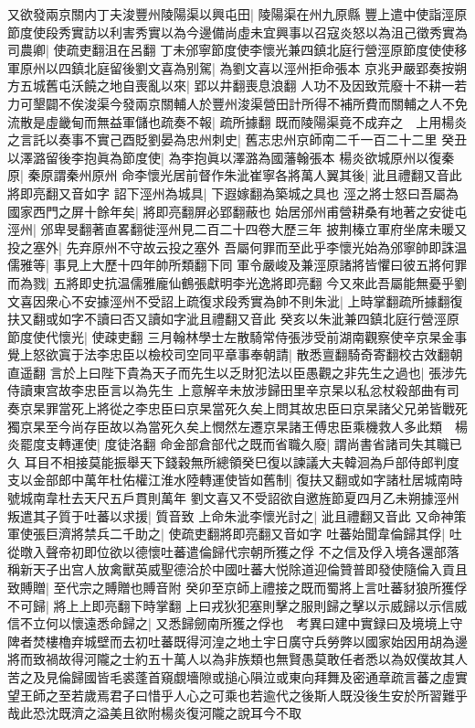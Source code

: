 又欲發兩京關内丁夫浚豐州陵陽渠以興屯田|{
	陵陽渠在州九原縣}
豐上遣中使詣涇原節度使段秀實訪以利害秀實以為今邊備尚虛未宜興事以召寇炎怒以為沮己徵秀實為司農卿|{
	使疏吏翻沮在呂翻}
丁未邠寧節度使李懷光兼四鎮北庭行營涇原節度使使移軍原州以四鎮北庭留後劉文喜為别駕|{
	為劉文喜以涇州拒命張本}
京兆尹嚴郢奏按朔方五城舊屯沃饒之地自喪亂以來|{
	郢以井翻喪息浪翻}
人功不及因致荒廢十不耕一若力可墾闢不俟浚渠今發兩京關輔人於豐州浚渠營田計所得不補所費而關輔之人不免流散是虛畿甸而無益軍儲也疏奏不報|{
	疏所據翻}
既而陵陽渠竟不成弃之　上用楊炎之言託以奏事不實己酉貶劉晏為忠州刺史|{
	舊志忠州京師南二千一百二十二里}
癸丑以澤潞留後李抱眞為節度使|{
	為李抱眞以澤潞為國藩翰張本}
楊炎欲城原州以復秦原|{
	秦原謂秦州原州}
命李懷光居前督作朱泚崔寧各將萬人翼其後|{
	泚且禮翻又音此將即亮翻又音如字}
詔下涇州為城具|{
	下遐嫁翻為築城之具也}
涇之將士怒曰吾屬為國家西門之屏十餘年矣|{
	將即亮翻屏必郢翻蔽也}
始居邠州甫營耕桑有地著之安徙屯涇州|{
	邠卑旻翻著直畧翻徙涇州見二百二十四卷大歷三年}
披荆榛立軍府坐席未暖又投之塞外|{
	先弃原州不守故云投之塞外}
吾屬何罪而至此乎李懷光始為邠寧帥即誅温儒雅等|{
	事見上大歷十四年帥所類翻下同}
軍令嚴峻及兼涇原諸將皆懼曰彼五將何罪而為戮|{
	五將即史抗温儒雅龐仙鶴張獻明李光逸將即亮翻}
今又來此吾屬能無憂乎劉文喜因衆心不安據涇州不受詔上疏復求段秀實為帥不則朱泚|{
	上時掌翻疏所據翻復扶又翻或如字不讀曰否又讀如字泚且禮翻又音此}
癸亥以朱泚兼四鎮北庭行營涇原節度使代懷光|{
	使疎吏翻}
三月翰林學士左散騎常侍張涉受前湖南觀察使辛京杲金事覺上怒欲寘于法李忠臣以檢校司空同平章事奉朝請|{
	散悉亶翻騎奇寄翻校古效翻朝直遥翻}
言於上曰陛下貴為天子而先生以乏財犯法以臣愚觀之非先生之過也|{
	張涉先侍讀東宫故李忠臣言以為先生}
上意解辛未放涉歸田里辛京杲以私忿杖殺部曲有司奏京杲罪當死上將從之李忠臣曰京杲當死久矣上問其故忠臣曰京杲諸父兄弟皆戰死獨京杲至今尚存臣故以為當死久矣上憫然左遷京杲諸王傅忠臣乘機救人多此類　楊炎罷度支轉運使|{
	度徒洛翻}
命金部倉部代之既而省職久廢|{
	謂尚書省諸司失其職已久}
耳目不相接莫能振舉天下錢穀無所總領癸巳復以諫議大夫韓洄為戶部侍郎判度支以金部郎中萬年杜佑權江淮水陸轉運使皆如舊制|{
	復扶又翻或如字諸杜居城南時號城南韋杜去天尺五戶貫則萬年}
劉文喜又不受詔欲自邀旌節夏四月乙未朔據涇州叛遣其子質于吐蕃以求援|{
	質音致}
上命朱泚李懷光討之|{
	泚且禮翻又音此}
又命神策軍使張巨濟將禁兵二千助之|{
	使疏吏翻將即亮翻又音如字}
吐蕃始聞韋倫歸其俘|{
	吐從暾入聲帝初即位欲以德懷吐蕃遣倫歸代宗朝所獲之俘}
不之信及俘入境各還部落稱新天子出宫人放禽獸英威聖德洽於中國吐蕃大悦除道迎倫贊普即發使隨倫入貢且致賻贈|{
	至代宗之賻贈也賻音附}
癸卯至京師上禮接之既而蜀將上言吐蕃豺狼所獲俘不可歸|{
	將上上即亮翻下時掌翻}
上曰戎狄犯塞則擊之服則歸之擊以示威歸以示信威信不立何以懷遠悉命歸之|{
	又悉歸劒南所獲之俘也　考異曰建中實録曰及境境上守陴者焚樓櫓弃城壁而去初吐蕃既得河湟之地土宇日廣守兵勞弊以國家始因用胡為邊將而致禍故得河隴之士約五十萬人以為非族類也無賢愚莫敢任者悉以為奴僕故其人苦之及見倫歸國皆毛裘蓬首窺覷墻隙或搥心隕泣或東向拜舞及密通章疏言蕃之虛實望王師之至若歲焉君子曰惜乎人心之可乘也若逾代之後斯人既没後生安於所習難乎哉此恐沈既濟之溢美且欲附楊炎復河隴之說耳今不取}
